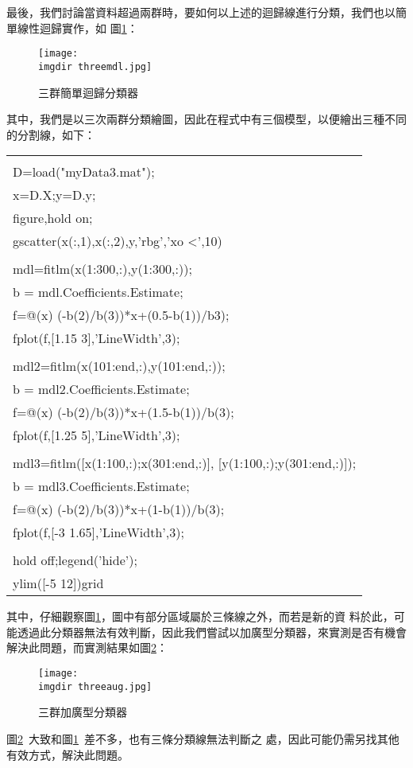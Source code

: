		最後，我們討論當資料超過兩群時，要如何以上述的迴歸線進行分類，我們也以簡單線性迴歸實作，如			圖\ref{fig:threemdl}：
		\begin{figure}[H]	
		 	\centering	 			 	 
   			\texttt{[image: \\imgdir threemdl.jpg]} 
   			\caption{三群簡單迴歸分類器}   		
   			\label{fig:threemdl}   			 		 
		\end{figure}
		其中，我們是以三次兩群分類繪圖，因此在程式中有三個模型，以便繪出三種不同的分割線，如下：
		\begin{center}\colorbox{slight}{
					\begin{tabular}{p{}}
						\MJHmarker{\textbf{\color{darkblue}{MATLAB語法 :}}}\\		
						D=load("myData3.mat");\\
						x=D.X;y=D.y;\\						
						figure,hold on;\\
						gscatter(x(:,1),x(:,2),y,'rbg','xo \textless ',10)\\
\\
						mdl=fitlm(x(1:300,:),y(1:300,:));\\
						b = mdl.Coefficients.Estimate;\\
						f=@(x) (-b(2)/b(3))*x+(0.5-b(1))/b3);\\
						fplot(f,[1.15 3],'LineWidth',3);\\
\\
						mdl2=fitlm(x(101:end,:),y(101:end,:));\\
						b = mdl2.Coefficients.Estimate;\\
						f=@(x) (-b(2)/b(3))*x+(1.5-b(1))/b(3);\\
						fplot(f,[1.25 5],'LineWidth',3);\\
\\
						mdl3=fitlm([x(1:100,:);x(301:end,:)],														[y(1:100,:);y(301:end,:)]);\\
						b = mdl3.Coefficients.Estimate;\\
						f=@(x) (-b(2)/b(3))*x+(1-b(1))/b(3);\\
						fplot(f,[-3 1.65],'LineWidth',3);\\
\\
						hold off;legend('hide');\\						
						ylim([-5 12])grid\\						
					\end{tabular}
				}
		\end{center}
		其中，仔細觀察圖\ref{fig:threemdl}，圖中有部分區域屬於三條線之外，而若是新的資					料於此，可能透過此分類器無法有效判斷，因此我們嘗試以加廣型分類器，來實測是否有機會					解決此問題，而實測結果如圖\ref{fig:threeaug}：
		\begin{figure}[H]	
		 	\centering	 			 	 
   			\texttt{[image: \\imgdir threeaug.jpg]} 
   			\caption{三群加廣型分類器}   		
   			\label{fig:threeaug}   			 		 
		\end{figure}
		圖\ref{fig:threeaug}\ 大致和圖\ref{fig:threemdl}\ 差不多，也有三條分類線無法判斷之			處，因此可能仍需另找其他有效方式，解決此問題。
